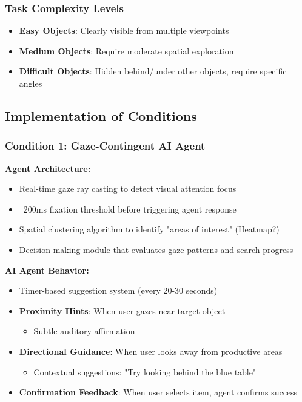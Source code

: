 \documentclass[12pt,letterpaper]{article}
\begin{document}
\subsubsection{Task Complexity Levels}
\begin{itemize}
    \item \textbf{Easy Objects}: Clearly visible from multiple viewpoints
    \item \textbf{Medium Objects}: Require moderate spatial exploration
    \item \textbf{Difficult Objects}: Hidden behind/under other objects, require specific angles
\end{itemize}

\subsection{Implementation of Conditions}

\subsubsection{Condition 1: Gaze-Contingent AI Agent}

\textbf{Agent Architecture:}
\begin{itemize}
    \item Real-time gaze ray casting to detect visual attention focus \citep{chiossi2024searching}
    \item ~200ms fixation threshold before triggering agent response
    \item Spatial clustering algorithm to identify "areas of interest" (Heatmap?)
    \item Decision-making module that evaluates gaze patterns and search progress
\end{itemize}

\textbf{AI Agent Behavior:}
\begin{itemize}
    \item Timer-based suggestion system (every 20-30 seconds)
    \item \textbf{Proximity Hints}: When user gazes near target object
    \begin{itemize}
        \item Subtle auditory affirmation
    \end{itemize}
    \item \textbf{Directional Guidance}: When user looks away from productive areas
    \begin{itemize}
        \item Contextual suggestions: "Try looking behind the blue table"
    \end{itemize}
    \item \textbf{Confirmation Feedback}: When user selects item, agent confirms success
\end{itemize}
\end{document}
